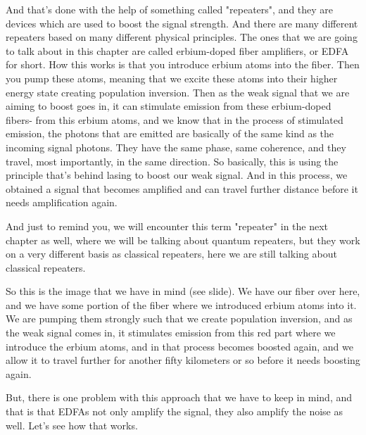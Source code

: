 And that's done with the help of something called "repeaters", and they are devices which are used to boost the signal strength. And there are many different repeaters based on many different physical principles. The ones that we are going to talk about in this chapter are called erbium-doped fiber amplifiers, or EDFA for short. How this works is that you introduce erbium atoms into the fiber. Then you pump these atoms, meaning that we excite these atoms into their higher energy state creating population inversion. Then as the weak signal that we are aiming to boost goes in, it can stimulate emission from these erbium-doped fibers- from this erbium atoms, and we know that in the process of stimulated emission, the photons that are emitted are basically of the same kind as the incoming signal photons. They have the same phase, same coherence, and they travel, most importantly, in the same direction. So basically, this is using the principle that's behind lasing to boost our weak signal. And in this process, we obtained a signal that becomes amplified and can travel further distance before it needs amplification again.

And just to remind you, we will encounter this term "repeater" in the next chapter as well, where we will be talking about quantum repeaters, but they work on a very different basis as classical repeaters, here we are still talking about classical repeaters.

So this is the image that we have in mind (see slide). We have our fiber over here, and we have some portion of the fiber where we introduced erbium atoms into it. We are pumping them strongly such that we create population inversion, and as the weak signal comes in, it stimulates emission from this red part where we introduce the erbium atoms, and in that process becomes boosted again, and we allow it to travel further for another fifty kilometers or so before it needs boosting again.

But, there is one problem with this approach that we have to keep in mind, and that is that EDFAs not only amplify the signal, they also amplify the noise as well. Let's see how that works.

